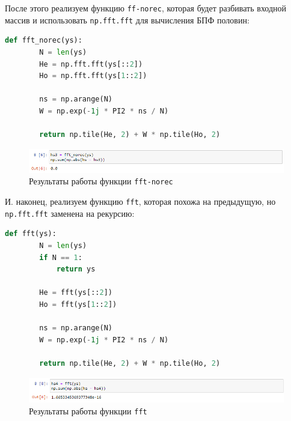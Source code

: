 \documentclass[a4paper]{article}
\begin{document}
            После этого реализуем функцию \texttt{ff-norec}, которая будет разбивать входной массив и использовать \texttt{np.fft.fft} для вычисления БПФ половин:
            
\begin{lstlisting}[language=Python, caption= Функция \texttt{fft-norec}]
    def fft_norec(ys):
        N = len(ys)
        He = np.fft.fft(ys[::2])
        Ho = np.fft.fft(ys[1::2])
        
        ns = np.arange(N)
        W = np.exp(-1j * PI2 * ns / N)
        
        return np.tile(He, 2) + W * np.tile(Ho, 2)
\end{lstlisting}
            
            \begin{figure}[H]
                \centering
                \includegraphics[width=\textwidth]{ex_2_fft_norec_result.png}
                \caption{Результаты работы функции \texttt{fft-norec}}
                \label{fig:ex_2_dfr_result}
            \end{figure}
            
            И. наконец, реализуем функцию \texttt{fft}, которая похожа на предыдущую, но \texttt{np.fft.fft} заменена на рекурсию:
            
\begin{lstlisting}[language=Python, caption= Функция \texttt{fft}]
    def fft(ys):
        N = len(ys)
        if N == 1:
            return ys
        
        He = fft(ys[::2])
        Ho = fft(ys[1::2])
        
        ns = np.arange(N)
        W = np.exp(-1j * PI2 * ns / N)
        
        return np.tile(He, 2) + W * np.tile(Ho, 2)
\end{lstlisting}
            
            \begin{figure}[H]
                \centering
                \includegraphics[width=\textwidth]{ex_2_fft_result.png}
                \caption{Результаты работы функции \texttt{fft}}
                \label{fig:ex_2_fft_result}
            \end{figure}
            
\end{document}
